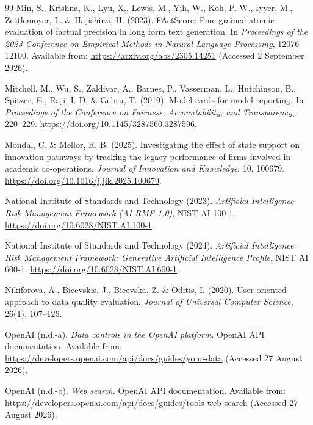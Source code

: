 \begin{thebibliography}{99}
Min, S., Krishna, K., Lyu, X., Lewis, M., Yih, W., Koh, P. W., Iyyer, M., Zettlemoyer, L.
\& Hajishirzi, H. (2023).
FActScore: Fine-grained atomic evaluation of factual precision in long form text generation.
In \emph{Proceedings of the 2023 Conference on Empirical Methods in Natural Language Processing},
12076--12100.
Available from: \url{https://arxiv.org/abs/2305.14251} (Accessed 2 September 2026).

Mitchell, M., Wu, S., Zaldivar, A., Barnes, P., Vasserman, L., Hutchinson, B., Spitzer, E.,
Raji, I. D. \& Gebru, T. (2019).
Model cards for model reporting.
In \emph{Proceedings of the Conference on Fairness, Accountability, and Transparency}, 220--229.
\url{https://doi.org/10.1145/3287560.3287596}.

Mondal, C. \& Mellor, R. B. (2025).
Investigating the effect of state support on innovation pathways by tracking the legacy performance
of firms involved in academic co-operations.
\emph{Journal of Innovation and Knowledge}, 10, 100679.
\url{https://doi.org/10.1016/j.jik.2025.100679}.

National Institute of Standards and Technology (2023).
\emph{Artificial Intelligence Risk Management Framework (AI RMF 1.0)}, NIST AI 100-1.
\url{https://doi.org/10.6028/NIST.AI.100-1}.

National Institute of Standards and Technology (2024).
\emph{Artificial Intelligence Risk Management Framework: Generative Artificial Intelligence
Profile}, NIST AI 600-1.
\url{https://doi.org/10.6028/NIST.AI.600-1}.

Nikiforova, A., Bicevskis, J., Bicevska, Z. \& Oditis, I. (2020).
User-oriented approach to data quality evaluation.
\emph{Journal of Universal Computer Science}, 26(1), 107--126.

OpenAI (n.d.-a).
\emph{Data controls in the OpenAI platform}. OpenAI API documentation.
Available from: \url{https://developers.openai.com/api/docs/guides/your-data}
(Accessed 27 August 2026).

OpenAI (n.d.-b).
\emph{Web search}. OpenAI API documentation.
Available from: \url{https://developers.openai.com/api/docs/guides/tools-web-search}
(Accessed 27 August 2026).


\end{thebibliography}
